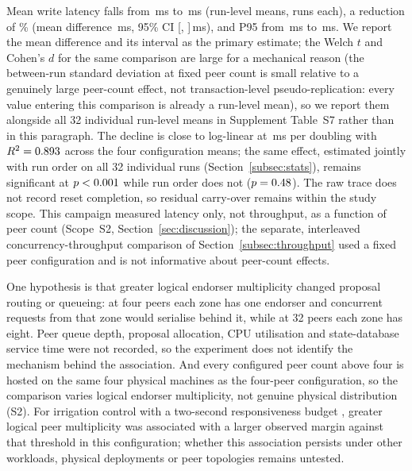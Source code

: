 \documentclass[a4paper,fleqn]{cas-sc}
\begin{document}
Mean write latency falls from \ScaleMinPeerMean\,ms to \ScaleMaxPeerMean\,ms
(run-level means, \PartRunsPerConfig{} runs each), a reduction of
\ScaleLatencyDropPct\% (mean difference \ScaleDiffMs\,ms, 95\% CI
[\ScaleDiffCILow, \ScaleDiffCIHigh]\,ms), and P95 from
\ScaleMinPeerPNinetyFive\,ms to \ScaleMaxPeerPNinetyFive\,ms. We report the
mean difference and its interval as the primary estimate; the Welch $t$
and Cohen's $d$ for the same comparison are large for a mechanical reason
(the between-run standard deviation at fixed peer count is small relative
to a genuinely large peer-count effect, not transaction-level
pseudo-replication: every value entering this comparison is already a
run-level mean), so we report them alongside all 32 individual run-level
means in Supplement Table~S7 rather than in this paragraph. The decline is
close to
log-linear at \ScaleSlope\,ms per doubling with $R^2 = 0.893$
across the four configuration means; the same effect, estimated jointly
with run order on all 32 individual runs (Section~\ref{subsec:stats}),
remains significant at $p<0.001$ while run order does not
($p=0.48$). The raw trace does not record reset completion,
so residual carry-over remains within the study scope. This campaign
measured latency only, not
throughput, as a function of peer count (Scope~S2,
Section~\ref{sec:discussion}); the separate, interleaved
concurrency-throughput comparison of Section~\ref{subsec:throughput} used
a fixed peer configuration and is not informative about peer-count
effects.

One hypothesis is that greater logical endorser multiplicity changed
proposal routing or queueing: at four peers each zone has one endorser and
concurrent requests from that zone would serialise behind it, while at 32
peers each zone has eight. Peer queue depth, proposal allocation, CPU
utilisation and state-database service time were not recorded, so the
experiment does not identify the mechanism behind the association. And
every configured peer count above four is hosted on the same four physical
machines as the four-peer configuration, so the comparison varies logical
endorser multiplicity, not genuine physical distribution (S2). For
irrigation control with a two-second
responsiveness budget \cite{leacox2013wireless}, greater logical peer
multiplicity was associated with a larger observed margin against that
threshold in this configuration; whether this association persists under
other workloads, physical deployments or peer topologies remains
untested.
\end{document}

